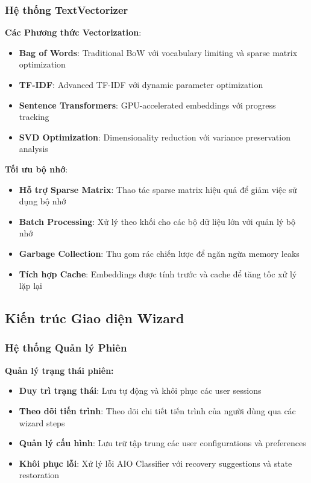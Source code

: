 \subsubsection{Hệ thống TextVectorizer}

\textbf{Các Phương thức Vectorization}:
\begin{itemize}
    \item \textbf{Bag of Words}: Traditional BoW với vocabulary limiting và sparse matrix optimization
    \item \textbf{TF-IDF}: Advanced TF-IDF với dynamic parameter optimization
    \item \textbf{Sentence Transformers}: GPU-accelerated embeddings với progress tracking
    \item \textbf{SVD Optimization}: Dimensionality reduction với variance preservation analysis
\end{itemize}

\textbf{Tối ưu bộ nhớ}:
\begin{itemize}
    \item \textbf{Hỗ trợ Sparse Matrix}: Thao tác sparse matrix hiệu quả để giảm việc sử dụng bộ nhớ
    \item \textbf{Batch Processing}: Xử lý theo khối cho các bộ dữ liệu lớn với quản lý bộ nhớ
    \item \textbf{Garbage Collection}: Thu gom rác chiến lược để ngăn ngừa memory leaks
    \item \textbf{Tích hợp Cache}: Embeddings được tính trước và cache để tăng tốc xử lý lặp lại
\end{itemize}

\subsection{Kiến trúc Giao diện Wizard}\label{subsec:wizard-integration}

\subsubsection{Hệ thống Quản lý Phiên}\label{subsec:session-management-system}

\textbf{Quản lý trạng thái phiên:}
\begin{itemize}
    \item \textbf{Duy trì trạng thái}: Lưu tự động và khôi phục các user sessions
    \item \textbf{Theo dõi tiến trình}: Theo dõi chi tiết tiến trình của người dùng qua các wizard steps
    \item \textbf{Quản lý cấu hình}: Lưu trữ tập trung các user configurations và preferences
    \item \textbf{Khôi phục lỗi}: Xử lý lỗi AIO Classifier với recovery suggestions và state restoration
\end{itemize}

